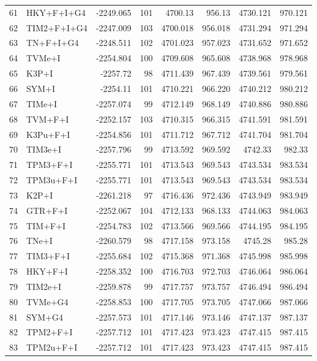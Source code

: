 \begin{longtable}{clrrrrrr}
	61 & HKY+F+I+G4 & -2249.065 & 101 & 4700.13 & 956.13 & 4730.121 & 970.121 \\ 
	62 & TIM2+F+I+G4 & -2247.009 & 103 & 4700.018 & 956.018 & 4731.294 & 971.294 \\ 
	63 & TN+F+I+G4 & -2248.511 & 102 & 4701.023 & 957.023 & 4731.652 & 971.652 \\ 
	64 & TVMe+I & -2254.804 & 100 & 4709.608 & 965.608 & 4738.968 & 978.968 \\ 
	65 & K3P+I & -2257.72 & 98 & 4711.439 & 967.439 & 4739.561 & 979.561 \\ 
	66 & SYM+I & -2254.11 & 101 & 4710.221 & 966.220 & 4740.212 & 980.212 \\ 
	67 & TIMe+I & -2257.074 & 99 & 4712.149 & 968.149 & 4740.886 & 980.886 \\ 
	68 & TVM+F+I & -2252.157 & 103 & 4710.315 & 966.315 & 4741.591 & 981.591 \\ 
	69 & K3Pu+F+I & -2254.856 & 101 & 4711.712 & 967.712 & 4741.704 & 981.704 \\ 
	70 & TIM3e+I & -2257.796 & 99 & 4713.592 & 969.592 & 4742.33 & 982.33 \\ 
	71 & TPM3+F+I & -2255.771 & 101 & 4713.543 & 969.543 & 4743.534 & 983.534 \\ 
	72 & TPM3u+F+I & -2255.771 & 101 & 4713.543 & 969.543 & 4743.534 & 983.534 \\ 
	73 & K2P+I & -2261.218 & 97 & 4716.436 & 972.436 & 4743.949 & 983.949 \\ 
	74 & GTR+F+I & -2252.067 & 104 & 4712.133 & 968.133 & 4744.063 & 984.063 \\ 
	75 & TIM+F+I & -2254.783 & 102 & 4713.566 & 969.566 & 4744.195 & 984.195 \\ 
	76 & TNe+I & -2260.579 & 98 & 4717.158 & 973.158 & 4745.28 & 985.28 \\ 
	77 & TIM3+F+I & -2255.684 & 102 & 4715.368 & 971.368 & 4745.998 & 985.998 \\ 
	78 & HKY+F+I & -2258.352 & 100 & 4716.703 & 972.703 & 4746.064 & 986.064 \\ 
	79 & TIM2e+I & -2259.878 & 99 & 4717.757 & 973.757 & 4746.494 & 986.494 \\ 
	80 & TVMe+G4 & -2258.853 & 100 & 4717.705 & 973.705 & 4747.066 & 987.066 \\ 
	81 & SYM+G4 & -2257.573 & 101 & 4717.146 & 973.146 & 4747.137 & 987.137 \\ 
	82 & TPM2+F+I & -2257.712 & 101 & 4717.423 & 973.423 & 4747.415 & 987.415 \\ 
	83 & TPM2u+F+I & -2257.712 & 101 & 4717.423 & 973.423 & 4747.415 & 987.415 \\ 

\end{longtable}
